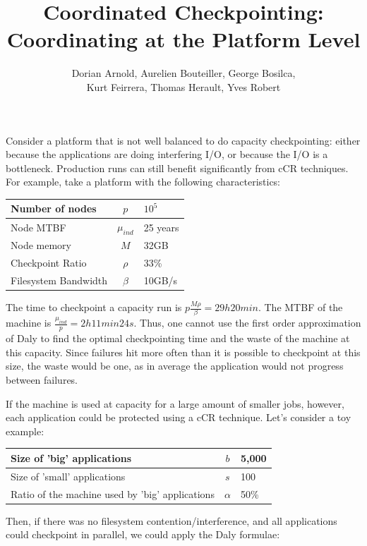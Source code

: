 \documentclass{article}
\author{Dorian Arnold, Aurelien Bouteiller, George Bosilca,\\
 Kurt Feirrera, Thomas Herault, Yves Robert}
\title{Coordinated Checkpointing: Coordinating at the Platform Level}
\begin{document}
\maketitle

Consider a platform that is not well balanced to do capacity checkpointing: either because the applications are doing interfering I/O, or because the I/O is a bottleneck. Production runs can still benefit significantly from cCR techniques. For example, take a platform with the following characteristics:

\begin{center}
\begin{tabular}{l|c|l}
  Number of nodes & $p$             & $10^5$ \\\hline
  Node MTBF           & $\mu_{ind}$ & 25 years\\\hline
  Node memory      & $M$             & 32GB\\\hline
  Checkpoint Ratio & $\rho$         & 33\%\\\hline
  Filesystem Bandwidth & $\beta$ & 10GB/s\\
\end{tabular}
\end{center}

The time to checkpoint a capacity run is $p\frac{M \rho}{\beta} = 29h20min$. The MTBF of the machine is $\frac{\mu_{ind}}{p} = 2h11min24s$. Thus, one cannot use the first order approximation of Daly to find the optimal checkpointing time and the waste of the machine at this capacity. Since failures hit more often than it is possible to checkpoint at this size, the waste would be one, as in average the application would not progress between failures.

If the machine is used at capacity for a large amount of smaller jobs, however, each application could be protected using a cCR technique. Let's consider a toy example:

\begin{center}
\begin{tabular}{lcl}
  Size of 'big' applications & $b$ & 5,000\\\hline
  Size of 'small' applications & $s$ & 100\\\hline
  Ratio of the machine used by 'big' applications & $\alpha$ & 50\%\\
\end{tabular}
\end{center}

Then, if there was no filesystem contention/interference, and all applications could checkpoint in parallel, we could apply the Daly formulae:
\end{document}
